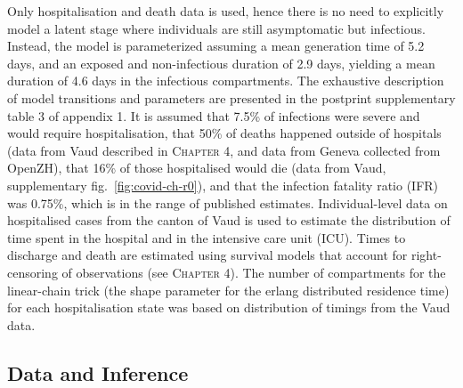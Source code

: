 Only hospitalisation and death data is used, hence there is no need to explicitly model a latent stage where individuals are still asymptomatic but infectious\cite[-8\baselineskip]{Ganyani:EstimatingGenerationInterval:2020,He:TemporalDynamicsViral:2020, Liu:ContributionPresymptomaticInfection:2020}. Instead, the model is parameterized assuming a mean generation time of 5.2 days\cite[-2\baselineskip]{Ganyani:EstimatingGenerationInterval:2020}, and an exposed and non-infectious duration of 2.9 days\cite[-1\baselineskip]{He:TemporalDynamicsViral:2020}, yielding a mean duration of 4.6 days in the infectious compartments. The exhaustive description of model transitions and parameters are presented in the postprint supplementary table 3 of appendix 1. It is assumed that 7.5\% of infections were severe and would require hospitalisation, that 50\% of deaths happened outside of hospitals (data from Vaud described in \textsc{Chapter 4}, and data from Geneva collected from OpenZH), that 16\% of those hospitalised would die (data from Vaud, supplementary fig.~\ref{fig:covid-ch-r0}), and that the infection fatality ratio (IFR) was 0.75\%, which is in the range of published estimates\cite[-4\baselineskip]{Verity:EstimatesSeverityCoronavirus:2020, Russell:EstimatingInfectionCase:2020}. Individual-level data on hospitalised cases from the canton of Vaud is used to estimate the distribution of time spent in the hospital and in the intensive care unit (ICU). Times to discharge and death are estimated using survival models that account for right-censoring of observations (see \textsc{Chapter 4}). The number of compartments for the linear-chain trick (\ie the shape parameter for the erlang distributed residence time)  for each hospitalisation state was based on distribution of timings from the Vaud data. 
\subsection{Data and Inference} 
